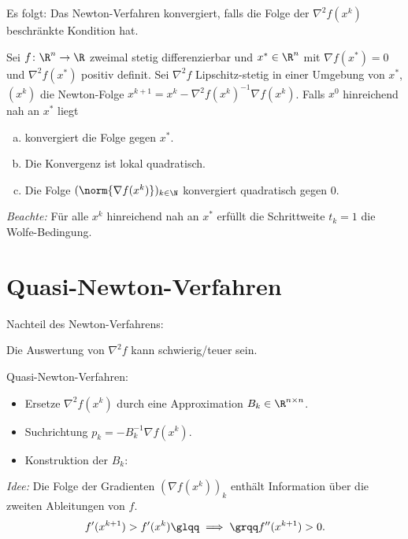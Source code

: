 Es folgt:  Das Newton-Verfahren konvergiert,
falls die Folge der $\nabla^2 f (x^k )$ beschränkte Kondition hat.

\begin{satz}
Sei $f \colon \R^n \to \R$ zweimal stetig differenzierbar und $x^* \in \R^n$ mit $\nabla f (x^* )=0$ und $\nabla^2 f (x^* )$ positiv definit. Sei $\nabla^2f$ Lipschitz-stetig in einer Umgebung von $x^*$, $(x^k )$ die Newton-Folge $x^{k+1}=x^k-\nabla^2f (x^k )^{-1} \nabla f (x^k )$. Falls $x^0$ hinreichend nah an $x^*$ liegt
\begin{enumerate}[a)]
 \item konvergiert die Folge gegen $x^*$.
 \item Die Konvergenz ist lokal quadratisch.
 \item Die Folge $( \norm{\nabla f(x^k)} )_{k \in \N}$ konvergiert quadratisch gegen $0$.
\end{enumerate}
\end{satz}
\emph{Beachte:} Für alle $x^k$ hinreichend nah an $x^*$ erfüllt die Schrittweite $t_k=1$ die Wolfe-Bedingung.

\section{Quasi-Newton-Verfahren}
Nachteil des Newton-Verfahrens:

Die Auswertung von $\nabla^2f$ kann schwierig/teuer sein.

\bigskip

Quasi-Newton-Verfahren:
\begin{itemize}
\item Ersetze $\nabla^2 f(x^k)$ durch eine Approximation $B_k \in \R^{n \times n}$.
	\item Suchrichtung $p_k=-B_k^{-1} \nabla f (x^k )$.
	\item Konstruktion der $B_k$:
\end{itemize}

\emph{Idee:} Die Folge der Gradienten $( \nabla f (x^k ) )_k$ enthält Information über die zweiten Ableitungen von $f$. \begin{equation*}
 f'(x^{k+1}) > f'(x^k) \text{\glqq}\implies\text{\grqq} f'' (x^{k+1} )>0.
\end{equation*}

